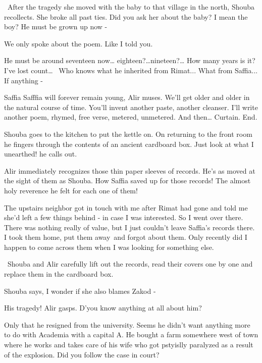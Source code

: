 \documentclass[letterpaper]{article}
\begin{document}
~{\textquotedbl}After the tragedy she moved with the baby to that village in the north,{\textquotedbl} Shouba
recollects. {\textquotedbl}She broke all past ties. Did you ask her about the baby? I mean the boy? He must be grown up
now - {\textquotedbl} 

{\textquotedbl}We only spoke about the poem. Like I told you.{\textquotedbl} 

{\textquotedbl}He must be around seventeen now{\dots} eighteen?{\dots}nineteen?{\dots} How many years is it? I've lost
count{\dots} ~Who knows what he inherited from Rimat... What from Saffia... If anything -{\textquotedbl} 

{\textquotedbl}Saffia Safffia will forever remain young,{\textquotedbl} Alir muses. {\textquotedbl}We'll get older and
older in the natural course of time. You'll invent another paste, another cleanser. I'll write another poem, rhymed,
free verse, metered, unmetered. And then{\dots} Curtain. End.{\textquotedbl}

Shouba goes to the kitchen to put the kettle on. On returning to the front room he fingers through the contents of an
ancient cardboard box. {\textquotedbl}Just look at what I unearthed!{\textquotedbl} he calls out.

Alir immediately recognizes those thin paper sleeves of records. He's as moved at the sight of them as Shouba.
{\textquotedbl}How Saffia saved up for those records! The almost holy reverence he felt for each one of
them!{\textquotedbl} 

{\textquotedbl}The upstairs neighbor got in touch with me after Rimat had gone and told me she'd left a few things
behind - in case I was interested. So I went over there. There was nothing really of value, but I just couldn't leave
Saffia's records there. I took them home, put them away~and forgot about them. Only recently did I happen to come
across them when I was looking for something else.{\textquotedbl}

~Shouba and Alir carefully lift out the records, read their covers one by one and replace them in the cardboard box. 

Shouba says, {\textquotedbl}I wonder if she also blames Zakod -{\textquotedbl} 

{\textquotedbl}His tragedy!{\textquotedbl} Alir gasps. {\textquotedbl}D'you know anything at all about
him?{\textquotedbl} 

{\textquotedbl}Only that he resigned from the university. Seems he didn't want anything more to do with Academia with a
capital A. He bought a farm somewhere west of town where he works and takes care of his wife who got pstyislly
paralyzed as a result of the explosion. Did you follow the case in court?{\textquotedbl} 
\end{document}
